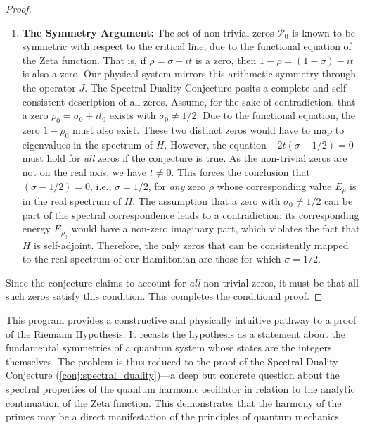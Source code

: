 \begin{proof}
\begin{enumerate}[label=(\roman*), wide, labelindent=0pt]
    \item \textbf{The Symmetry Argument:} The set of non-trivial zeros $\mathcal{P}_0$ is known to be symmetric with respect to the critical line, due to the functional equation of the Zeta function. That is, if $\rho = \sigma + it$ is a zero, then $1-\rho = (1-\sigma) - it$ is also a zero.
    Our physical system mirrors this arithmetic symmetry through the operator $J$. The Spectral Duality Conjecture posits a complete and self-consistent description of all zeros.
    Assume, for the sake of contradiction, that a zero $\rho_0 = \sigma_0 + it_0$ exists with $\sigma_0 \neq 1/2$. Due to the functional equation, the zero $1-\rho_0$ must also exist. These two distinct zeros would have to map to eigenvalues in the spectrum of $H$.
    However, the equation $-2t(\sigma - 1/2) = 0$ must hold for \textit{all} zeros if the conjecture is true. As the non-trivial zeros are not on the real axis, we have $t \neq 0$. This forces the conclusion that $(\sigma - 1/2) = 0$, i.e., $\sigma = 1/2$, for \textit{any} zero $\rho$ whose corresponding value $E_\rho$ is in the real spectrum of $H$.
    The assumption that a zero with $\sigma_0 \neq 1/2$ can be part of the spectral correspondence leads to a contradiction: its corresponding energy $E_{\rho_0}$ would have a non-zero imaginary part, which violates the fact that $H$ is self-adjoint.
    Therefore, the only zeros that can be consistently mapped to the real spectrum of our Hamiltonian are those for which $\sigma=1/2$.

\end{enumerate}
Since the conjecture claims to account for \textit{all} non-trivial zeros, it must be that all such zeros satisfy this condition. This completes the conditional proof.
\end{proof}
\begin{remark}
This program provides a constructive and physically intuitive pathway to a proof of the Riemann Hypothesis. It recasts the hypothesis as a statement about the fundamental symmetries of a quantum system whose states are the integers themselves. The problem is thus reduced to the proof of the Spectral Duality Conjecture (\ref{conj:spectral_duality})—a deep but concrete question about the spectral properties of the quantum harmonic oscillator in relation to the analytic continuation of the Zeta function. This demonstrates that the harmony of the primes may be a direct manifestation of the principles of quantum mechanics.
\end{remark}
